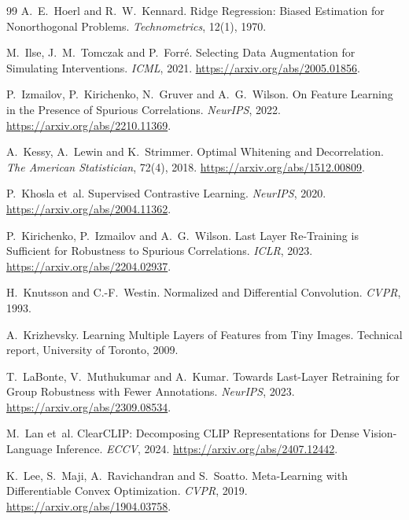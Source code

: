 \documentclass[11pt]{article}
\begin{document}
\begin{thebibliography}{99}
A.~E.~Hoerl and R.~W.~Kennard. Ridge Regression: Biased Estimation for Nonorthogonal Problems. \emph{Technometrics},
12(1), 1970.

M.~Ilse, J.~M.~Tomczak and P.~Forr\'e. Selecting Data Augmentation for Simulating Interventions. \emph{ICML}, 2021.
\url{https://arxiv.org/abs/2005.01856}.

P.~Izmailov, P.~Kirichenko, N.~Gruver and A.~G.~Wilson. On Feature Learning in the Presence of Spurious Correlations.
\emph{NeurIPS}, 2022. \url{https://arxiv.org/abs/2210.11369}.

A.~Kessy, A.~Lewin and K.~Strimmer. Optimal Whitening and Decorrelation. \emph{The American Statistician}, 72(4), 2018.
\url{https://arxiv.org/abs/1512.00809}.

P.~Khosla et~al. Supervised Contrastive Learning. \emph{NeurIPS}, 2020. \url{https://arxiv.org/abs/2004.11362}.

P.~Kirichenko, P.~Izmailov and A.~G.~Wilson. Last Layer Re-Training is Sufficient for Robustness to Spurious
Correlations. \emph{ICLR}, 2023. \url{https://arxiv.org/abs/2204.02937}.

H.~Knutsson and C.-F.~Westin. Normalized and Differential Convolution. \emph{CVPR}, 1993.

A.~Krizhevsky. Learning Multiple Layers of Features from Tiny Images. Technical report, University of Toronto, 2009.

T.~LaBonte, V.~Muthukumar and A.~Kumar. Towards Last-Layer Retraining for Group Robustness with Fewer Annotations.
\emph{NeurIPS}, 2023. \url{https://arxiv.org/abs/2309.08534}.

M.~Lan et~al. ClearCLIP: Decomposing CLIP Representations for Dense Vision-Language Inference. \emph{ECCV}, 2024.
\url{https://arxiv.org/abs/2407.12442}.

K.~Lee, S.~Maji, A.~Ravichandran and S.~Soatto. Meta-Learning with Differentiable Convex Optimization. \emph{CVPR},
2019. \url{https://arxiv.org/abs/1904.03758}.


\end{thebibliography}
\end{document}

